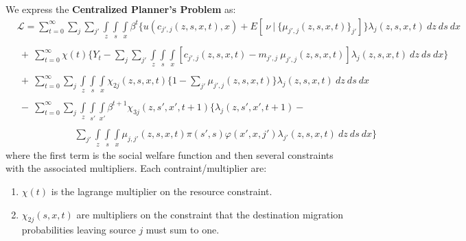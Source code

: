 \documentclass[12pt,pdftex]{article}
\begin{document}
\begin{onehalfspacing}
We express the \textbf{Centralized Planner's Problem} as:
{\small
\begin{align}
& \mathcal{L}  =   \sum_{t=0}^{\infty}\sum_{j} \sum_{j'} \int\limits_{z} \int\limits_{s} \int\limits_{x} \beta^{t} \bigg \{ u(c_{j',j}(z, s, x, t), x) + E[ \ \nu \ | \ \big\{\mu_{j',j}(z,s,x,t)\big\}_{j'}] \bigg \} \lambda_{j}(z, s, x, t) \ dz \ ds \ dx \label{eq:planner_L} \\
\nonumber \\
 & \ + \ \sum_{t=0}^{\infty} \chi(t) \bigg \{ Y_t - \sum_{j}\sum_{j'} \int\limits_{z} \int\limits_{s} \int\limits_{x} \left[ c_{j',j}(z, s, x, t)  -   m_{j',j} \ \mu_{j',j}(z, s, x, t)\right] \lambda_{j}(z, s, x, t) \ dz \ ds \ dx \bigg \} \nonumber \\
\nonumber  \\
& \ + \ \sum_{t=0}^{\infty} \sum_{j} \int\limits_{z} \int\limits_{s} \int\limits_{x} \chi_{2j}(z, s, x, t) \bigg \{1 - \sum_{j'} \mu_{j',j}(z, s, x,t) \bigg \} \lambda_{j}(z, s, x, t) \ dz \ ds \ dx \nonumber \\
\nonumber \\
& \ - \ \sum_{t=0}^{\infty} \sum_{j} \int\limits_{z} \int\limits_{s'} \int\limits_{x'} \beta^{t+1} \chi_{3j}(z, s', x', t+1) \bigg \{\lambda_{j}(z, s', x', t+1) - \nonumber \\
\nonumber \\
& \ \ \ \ \ \ \ \ \ \ \ \ \ \ \ \ \ \ \ \ \ \ \ \ \ \ \
 \sum_{j'} \int\limits_{z} \int\limits_{s} \int\limits_{x} \mu_{j,j'}(z,s,x,t) \pi(s',s) \varphi(x',x, j') \lambda_{j'}(z,s, x, t) \ dz \ ds  \ dx  \bigg \} \nonumber
\end{align}}where the first term is the social welfare function and then several constraints with the associated multipliers. Each contraint/multiplier are:
\begin{enumerate}
\item $\chi(t)$ is the lagrange multiplier on the resource constraint.

\item $\chi_{2j}(s, x, t)$ are multipliers on the constraint that the destination migration probabilities leaving source $j$ must sum to one.


\end{enumerate}
\end{onehalfspacing}
\end{document}

